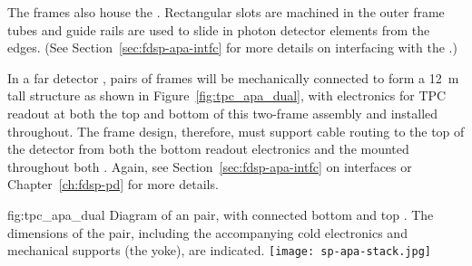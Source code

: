 
The  frames also house the .  %
Rectangular slots are machined in the outer frame tubes and guide rails are used to slide in photon detector elements from the edges. %
(See Section~\ref{sec:fdsp-apa-intfc} for more details on interfacing with the .)   

In a far detector , pairs of  frames will be mechanically connected to form a \SI{12}{m} tall structure as shown in Figure~\ref{fig:tpc_apa_dual}, with electronics for TPC readout at both the top and bottom of this two-frame assembly and  installed throughout.  The  frame design, therefore, must support cable routing to the top of the detector from both the bottom  readout electronics and the  mounted throughout both .  %
Again, see Section~\ref{sec:fdsp-apa-intfc} on interfaces or Chapter~\ref{ch:fdsp-pd} for more details.


\begin{dunefigure}{fig:tpc_apa_dual}
{Diagram of an  pair, with connected bottom and top . The dimensions of the  pair, including the accompanying cold electronics and mechanical supports (the yoke), are indicated.}
\texttt{[image: sp-apa-stack.jpg]} 
\end{dunefigure}



